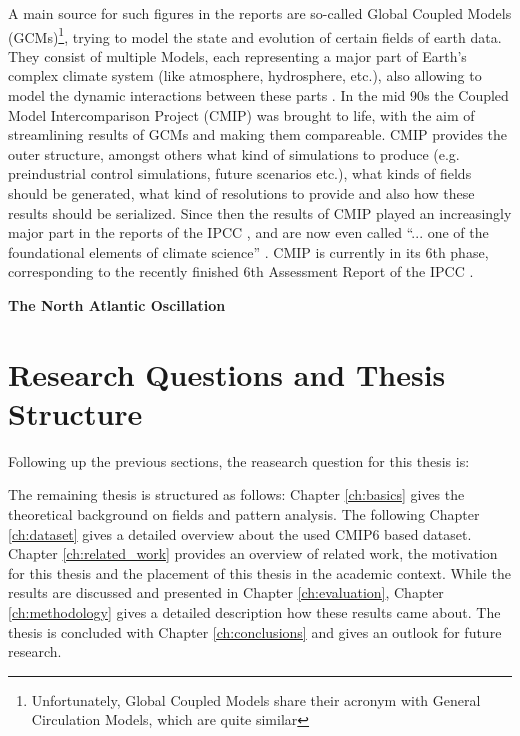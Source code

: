 A main source for such figures in the reports are so-called Global Coupled Models (GCMs)\footnote{Unfortunately, Global Coupled Models share their acronym with General Circulation Models, which are quite similar}, trying to model the state and evolution of certain fields of earth data.
They consist of multiple Models, each representing a major part of Earth's complex climate system (like atmosphere, hydrosphere, etc.), also allowing to model the dynamic interactions between these parts \cite{vietinghoffdiss}. 
In the mid 90s the Coupled Model Intercomparison Project (CMIP) was brought to life, with the aim of streamlining results of GCMs and making them compareable. 
CMIP provides the outer structure, amongst others what kind of simulations to produce (e.g. preindustrial control simulations, future scenarios etc.), what kinds of fields should be generated, what kind of resolutions to provide and also how these results should be serialized.
Since then the results of CMIP played an increasingly major part in the reports of the IPCC \cite{touzepeiffer_coupled_2020}, and are now even called \enquote{... one of the foundational elements of climate science} \cite{eyring_overview_2016}. 
CMIP is currently in its 6th phase, corresponding to the recently finished 6th Assessment Report of the IPCC \cite{lee2024climate}. 



\textbf{The North Atlantic Oscillation}




 
\section{Research Questions and Thesis Structure}
\label{sec:research_questions}

Following up the previous sections, the reasearch question for this thesis is: 

\begin{center}
\end{center}


The remaining thesis is structured as follows: Chapter \ref{ch:basics} gives the theoretical background on fields and pattern analysis. 
The following Chapter \ref{ch:dataset} gives a detailed overview about the used CMIP6 based dataset. 
Chapter \ref{ch:related_work} provides an overview of related work, the motivation for this thesis and the placement of this thesis in the academic context. 
While the results are discussed and presented in Chapter \ref{ch:evaluation}, Chapter \ref{ch:methodology} gives a detailed description how these results came about. 
The thesis is concluded with Chapter \ref{ch:conclusions} and gives an outlook for future research. 



